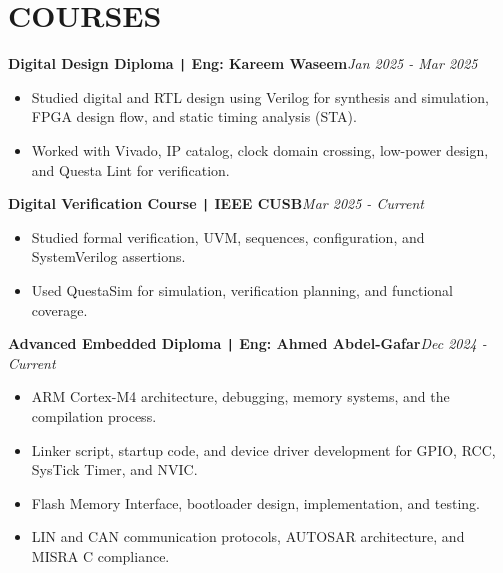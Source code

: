 \documentclass[11pt,a4paper]{article}
\begin{document}
\section*{\fontsize{14}{18}\textbf\selectfont COURSES}
\vspace{-0.3cm}
\begin{flushleft}
\textbf{Digital Design Diploma \texttt{|} Eng: Kareem Waseem}\hfill\textit{Jan 2025 - Mar 2025}\\
\end{flushleft}
\vspace{-0.7cm}
\begin{itemize}
\item \setlength{\itemsep}{-0.0em} Studied digital and RTL design using Verilog for synthesis and simulation, FPGA design flow, and static timing analysis (STA).
\item \setlength{\itemsep}{-0.0em} Worked with Vivado, IP catalog, clock domain crossing, low-power design, and Questa Lint for verification.
\end{itemize}
\vspace{-0.5cm}
\begin{flushleft}
\textbf{Digital Verification Course \texttt{|} IEEE CUSB}\hfill\textit{Mar 2025 - Current}\\
\end{flushleft}
\vspace{-0.7cm}
\begin{itemize}
\item \setlength{\itemsep}{-0.0em} Studied formal verification, UVM, sequences, configuration, and SystemVerilog assertions.
\item \setlength{\itemsep}{-0.0em} Used QuestaSim for simulation, verification planning, and functional coverage.
\end{itemize}
\vspace{-0.5cm}
\begin{flushleft}
\textbf{Advanced Embedded Diploma \texttt{|} Eng: Ahmed Abdel-Gafar}\hfill\textit{Dec 2024 - Current}\\
\end{flushleft}
\vspace{-0.7cm}
\begin{itemize}
\item \setlength{\itemsep}{-0.0em} ARM Cortex-M4 architecture, debugging, memory systems, and the compilation process.
\item \setlength{\itemsep}{-0.0em} Linker script, startup code, and device driver development for GPIO, RCC, SysTick Timer, and NVIC.
\item \setlength{\itemsep}{-0.0em} Flash Memory Interface, bootloader design, implementation, and testing.
\item \setlength{\itemsep}{-0.0em} LIN and CAN communication protocols, AUTOSAR architecture, and MISRA C compliance.
\end{itemize}
\end{document}
